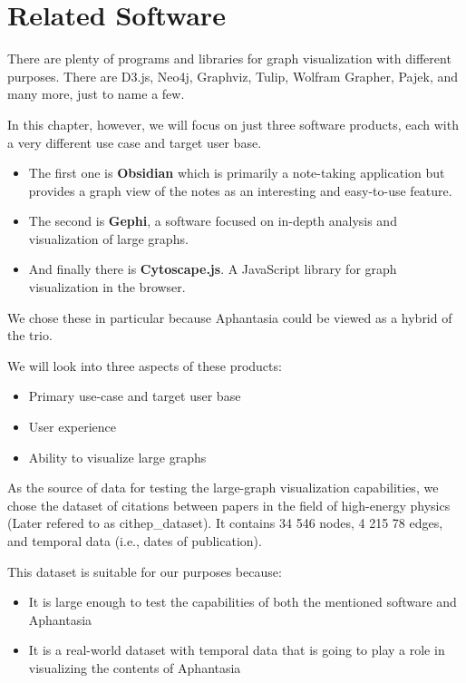 \chapter{Related Software}
\label{chap:related_software}

There are plenty of programs and libraries for \gls{graph} visualization with different purposes.
There are D3.js, Neo4j, Graphviz, Tulip, Wolfram Grapher, Pajek, and many more, just to name a few.

In this chapter, however, we will focus on just three software products, each with a very different use case and target user base.

\begin{itemize}

\item The first one is \textbf{Obsidian} which is primarily a note-taking application
but provides a graph view of the notes as an interesting and easy-to-use feature. 

\item The second is \textbf{Gephi}, a software focused on in-depth analysis and visualization of large graphs.

\item And finally there is \textbf{Cytoscape.js}. A JavaScript library for graph visualization in the browser.

\end{itemize}

We chose these in particular because Aphantasia could be viewed as a hybrid of the trio.

We will look into three aspects of these products:
\begin{itemize}
  \item Primary use-case and target user base
  \item User experience
  \item Ability to visualize large graphs
\end{itemize}

As the source of data for testing the large-graph visualization capabilities, we chose the dataset of citations between papers
in the field of high-energy physics \cite{snap_cit_hep} (Later refered to as \gls{cithep_dataset}).
It contains 34 546 nodes, 4 215 78 edges, and temporal data (i.e., dates of publication).

This dataset is suitable for our purposes because:
\begin{itemize}
  \item It is large enough to test the capabilities of both the mentioned software and Aphantasia
  \item It is a real-world dataset with temporal data that is going to play a role in visualizing the contents of Aphantasia
\end{itemize}

